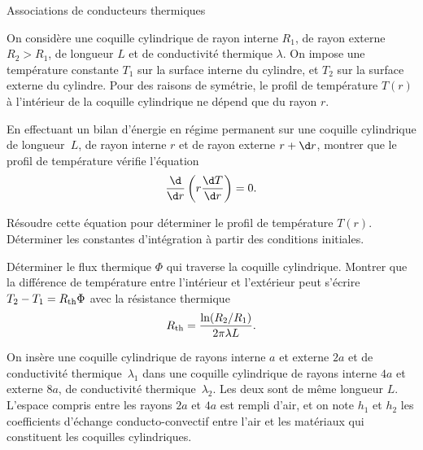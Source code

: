 \begin{exo}[PSI][1][colle]{Associations de conducteurs thermiques}

On considère une coquille cylindrique de rayon interne $R_1$, de rayon externe $R_2>R_1$, de longueur $L$ et de conductivité thermique $\lambda$. On impose une température constante $T_1$ sur la surface interne du cylindre, et $T_2$ sur la surface externe du cylindre. Pour des raisons de symétrie, le profil de température $T(r)$ à l'intérieur de la coquille cylindrique ne dépend que du rayon $r$.



\begin{quest}
	\item En effectuant un bilan d'énergie en régime permanent sur une coquille cylindrique de longueur~$L$, de rayon interne $r$ et de rayon externe $r+\d r$, montrer que le profil de température vérifie l'équation
\begin{equation}
\dfrac{\d }{\d r} \left(r\dfrac{\d T}{\d r} \right) = 0.
\end{equation}


	\item Résoudre cette équation pour déterminer le profil de température $T(r)$. Déterminer les constantes d'intégration à partir des conditions initiales.


	\item Déterminer le flux thermique $\Phi$ qui traverse la coquille cylindrique. Montrer que la différence de température entre l'intérieur et l'extérieur peut s'écrire $T_2-T_1 = R_{\rm th} \Phi$ avec la résistance thermique
	\begin{equation}
	R_{\rm th} = \dfrac{\ln(R_2/R_1)}{2\pi\lambda L}.
	\end{equation}


\end{quest}

On insère une coquille cylindrique de rayons interne $a$ et externe $2a$ et de conductivité thermique~$\lambda_1$ dans une coquille cylindrique de rayons interne $4a$ et externe $8a$, de conductivité thermique~$\lambda_2$. Les deux sont de même longueur $L$. L'espace compris entre les rayons $2a$ et $4a$ est rempli d'air, et on note $h_1$ et $h_2$ les coefficients d'échange conducto-convectif entre l'air et les matériaux qui constituent les coquilles cylindriques.


\end{exo}
